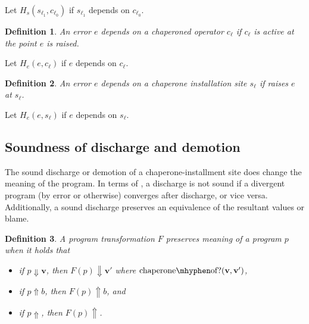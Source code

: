\documentclass{sigplanconf}
\newtheorem{definition}{Definition}
\begin{document}
Let $H_s(s_{\ell_1},c_{\ell_0})$ if $s_{\ell_1}$ depends on $c_{\ell_0}$.

\begin{definition}
An error $e$ \emph{depends} on a chaperoned operator $c_\ell$ if $c_\ell$  is active at the point $e$ is raised.
\end{definition}

Let $H_e(e,c_\ell)$ if $e$ depends on $c_\ell$.

\begin{definition}
An error $e$ \emph{depends} on a chaperone installation site $s_\ell$ if  raises $e$ at $s_\ell$.
\end{definition}

Let $H_e(e,s_\ell)$ if $e$ depends on $s_\ell$.


\subsection{Soundness of discharge and demotion}

The sound discharge or demotion of a chaperone-installment site does change the meaning of the program.
In terms of \chapcalc, a discharge is not sound if a divergent program (by error or otherwise) converges after discharge, or vice versa.
Additionally, a sound discharge preserves an equivalence of the resultant values or blame.

\begin{definition}
A program transformation $F$ \emph{preserves meaning} of a program $p$ when it holds that
\begin{itemize}
\item if $p\Downarrow\mathbf{v}$, then $F(p)\Downarrow\mathbf{v'}$ where $\mathrm{chaperone\mhyphen of?}(\mathbf{v},\mathbf{v'})$,
\item if $p\Uparrow b$, then $F(p)\Uparrow b$, and
\item if $p\Uparrow$, then $F(p)\Uparrow$.
\end{itemize}
\end{definition}
\end{document}
